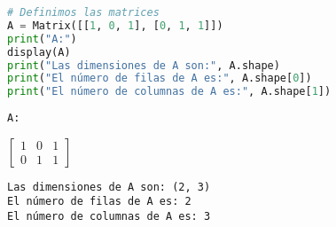 \documentclass[a4,11pt]{aleph-notas}
\begin{document}
\begin{pycodigo}
    \begin{ipynbcodigo}\begin{lstlisting}[language=Python]
# Definimos las matrices
A = Matrix([[1, 0, 1], [0, 1, 1]])
print("A:")
display(A)
print("Las dimensiones de A son:", A.shape)
print("El número de filas de A es:", A.shape[0])
print("El número de columnas de A es:", A.shape[1])
    \end{lstlisting}\end{ipynbcodigo}
    \begin{ipynbsalida}
    \begin{Verbatim}
A:
    \end{Verbatim}
    $\displaystyle \left[\begin{matrix}1 & 0 & 1\\0 & 1 & 1\end{matrix}\right]$
    \begin{Verbatim}
Las dimensiones de A son: (2, 3)
El número de filas de A es: 2
El número de columnas de A es: 3
    \end{Verbatim}
    \end{ipynbsalida}
\end{pycodigo}
\end{document}
